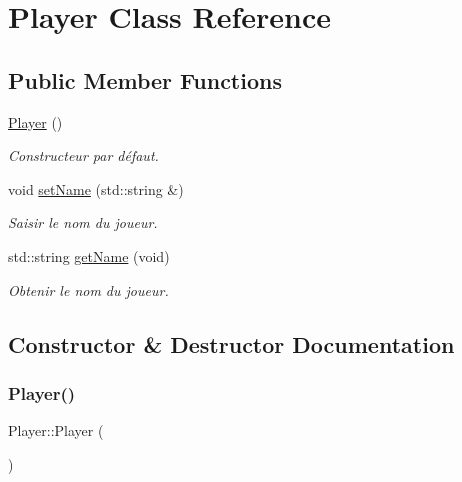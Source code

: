 \hypertarget{class_player}{}\section{Player Class Reference}
\label{class_player}
\subsection*{Public Member Functions}
\begin{DoxyCompactItemize}
\item 
\hyperlink{class_player_affe0cc3cb714f6deb4e62f0c0d3f1fd8}{Player} ()
\begin{DoxyCompactList}\small\item\em Constructeur par défaut. \end{DoxyCompactList}\item 
\mbox{\label{class_player_a9afd1a776feece693c2c156c4fa6fcfa}} 
void \hyperlink{class_player_a9afd1a776feece693c2c156c4fa6fcfa}{set\+Name} (std\+::string \&)
\begin{DoxyCompactList}\small\item\em Saisir le nom du joueur. \end{DoxyCompactList}\item 
\mbox{\label{class_player_aba43f9cd269078f92ec3423854718644}} 
std\+::string \hyperlink{class_player_aba43f9cd269078f92ec3423854718644}{get\+Name} (void)
\begin{DoxyCompactList}\small\item\em Obtenir le nom du joueur. \end{DoxyCompactList}\end{DoxyCompactItemize}


\subsection{Constructor \& Destructor Documentation}
\mbox{\label{class_player_affe0cc3cb714f6deb4e62f0c0d3f1fd8}} 
\subsubsection{\texorpdfstring{Player()}{Player()}}
{\footnotesize\ttfamily Player\+::\+Player (\begin{DoxyParamCaption}{ }\end{DoxyParamCaption})}



